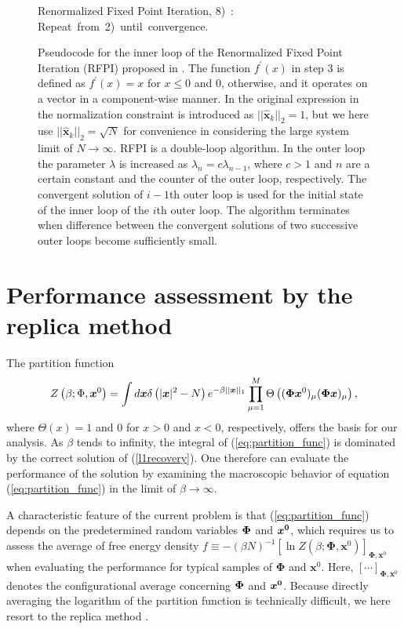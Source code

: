 \documentclass[12pt]{iopart}
\newcommand{\vm}[1]{\boldsymbol{#1}}
\begin{document}
\begin{figure}
\begin{pseudocode}[ruled]{Renormalized Fixed Point Iteration}{\delta,\lambda}
8)\ : \mbox{Repeat from 2) until convergence.}
\end{pseudocode}
\protect
\caption{\protect\label{RFPI}Pseudocode for the inner loop of the Renormalized Fixed Point Iteration (RFPI) proposed in \cite{1bitCS}. The function $f^\prime (x)$ in step 3 is defined as $f^\prime (x)=x$ for $x \le 0$ and $0$, otherwise, and it operates on a vector in a component-wise manner. In the original expression in \cite{1bitCS} the normalization constraint is introduced as $||\hat{\mathbf{x}}_{k}||_2=1$, but we here use 
$||\hat{\mathbf{x}}_{k}||_2=\sqrt{N}$ for convenience in considering the large system limit of $N \to \infty$. RFPI is a double-loop algorithm. In the outer loop the parameter $\lambda$ is increased as $\lambda_n=c \lambda_{n-1}$, where $c>1$ and $n$ are a certain constant and the counter of the outer loop, respectively. The convergent solution of $i-1$th outer loop is used for the initial state of the inner loop of the $i$th outer loop. The algorithm terminates when difference between the convergent solutions of two successive outer loops become sufficiently small.}
\end{figure}

\section{Performance assessment by the replica method}
The partition function 
\begin{equation}
Z\left(\beta; \Phi, \textrm{\boldmath $x$}^{0} \right)=\int d \textrm{\boldmath $x$}
\delta\left(\vert \textrm{\boldmath $x$}\vert^{2}-N\right)e^{-\beta\vert\vert\textrm{\boldmath $x$}\vert\vert _{1}}
\prod_{\mu=1}^M \Theta\left ( (\vm{\Phi} \vm{x}^0 )_\mu  (\vm{\Phi} \vm{x})_\mu \right )
\label{eq:partition_func},
\end{equation}
where $\Theta\left(x \right)=1$ 
and $0$ for $x>0$ and $x<0$, respectively, offers the basis for our analysis. As $\beta$ tends to infinity, the integral of (\ref{eq:partition_func}) is dominated by the correct solution of (\ref{l1recovery}). One therefore can evaluate the performance of the solution by examining the macroscopic behavior of equation (\ref{eq:partition_func}) in the limit of $\beta\rightarrow \infty$.

A characteristic feature of the current problem is that (\ref{eq:partition_func}) depends on the predetermined random variables $\textrm{\boldmath $\Phi$}$ and $\textrm{\boldmath $x^{0}$} $, which requires us to assess the average of free energy density $f \equiv -(\beta N)^{-1} \left [\ln Z(\beta; \vm{\Phi},\vm{x}^0) \right]_{\vm{\Phi},\vm{x}^0}$ when evaluating the performance for typical samples of $\vm{\Phi}$ and $\vm{x}^0$. Here, $\left [\cdots \right]_{\vm{\Phi},\vm{x}^0}$ denotes the configurational average concerning $\textrm{\boldmath $\Phi$}$ and $\textrm{\boldmath $x^{0}$}$. Because directly averaging the logarithm of the partition function is technically difficult, we here resort to the replica method \cite{replica}. 
\end{document}

